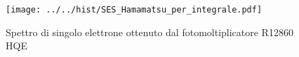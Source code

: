\begin{figure}[h] \centering \texttt{[image: ../../hist/SES\_Hamamatsu\_per\_integrale.pdf]}\caption{Spettro di singolo elettrone ottenuto dal fotomoltiplicatore R12860 HQE}\label{hist:SES_Hamamatsu_per_integrale} \end{figure}
